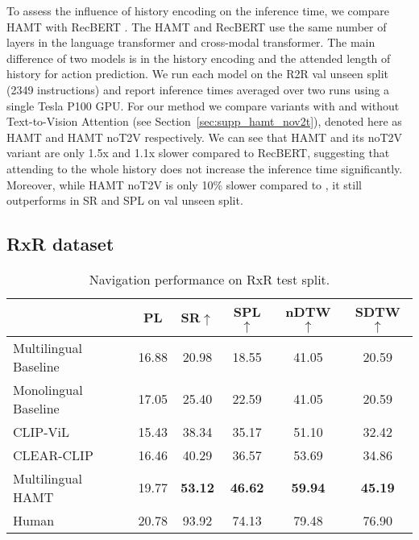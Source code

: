 To assess the influence of history encoding on the inference time, we compare HAMT with RecBERT \cite{hong2020recurrent}. The HAMT and RecBERT use the same number of layers in the language transformer and cross-modal transformer. The main difference of two models is in the history encoding and the attended length of history for action prediction. We run each model on the R2R val unseen split (2349 instructions) and report inference times averaged over two runs using a single Tesla P100 GPU. 
For our method we compare variants with and without Text-to-Vision Attention (see Section~\ref{sec:supp_hamt_nov2t}), denoted here as HAMT and HAMT noT2V respectively.
We can see that HAMT and its noT2V variant are only 1.5x and 1.1x slower compared to RecBERT, suggesting that attending to the whole history does not increase the inference time significantly. Moreover, while HAMT noT2V is only 10\% slower compared to \cite{hong2020recurrent}, it still outperforms \cite{hong2020recurrent} in SR and SPL on val unseen split.

\subsection{RxR dataset}

\begin{wraptable}{r}{0.6\textwidth}
\centering
\small
\tabcolsep=0.1cm
\vspace{-1em}
\caption{Navigation performance on RxR test split.}
\label{tab:supp_rxr_test_cmpr}
\begin{tabular}{lccccc} \toprule
 & PL & SR$\uparrow$ & SPL$\uparrow$ & nDTW$\uparrow$ & SDTW$\uparrow$ \\ \midrule
Multilingual Baseline \cite{ku2020room} & 16.88 & 20.98 & 18.55 & 41.05 & 20.59 \\
Monolingual Baseline \cite{ku2020room} & 17.05 & 25.40 & 22.59 & 41.05 & 20.59 \\
CLIP-ViL & 15.43 & 38.34 & 35.17 & 51.10 & 32.42 \\
CLEAR-CLIP & 16.46 & 40.29 & 36.57 & 53.69 & 34.86 \\
Multilingual HAMT & 19.77 & \textbf{53.12} & \textbf{46.62} & \textbf{59.94} & \textbf{45.19} \\ \midrule
Human & 20.78 & 93.92 & 74.13 & 79.48 & 76.90 \\ \bottomrule
\end{tabular}
\end{wraptable}


